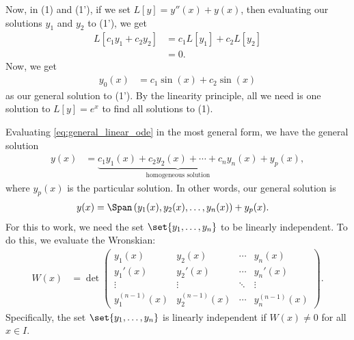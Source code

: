 \documentclass[10pt]{mypackage}
\begin{document}
Now, in (1) and (1'), if we set $L\left[y\right] = y''(x) + y(x)$, then evaluating our solutions $y_1$ and $y_2$ to (1'), we get
\begin{align*}
  L\left[c_1y_1 + c_2y_2\right] &= c_1L\left[y_1\right] + c_2L\left[y_2\right]\\
                                &= 0.
\end{align*}
Now, we get
\begin{align*}
  y_0(x) &= c_1\sin(x) + c_2\sin(x)
\end{align*}
as our general solution to (1'). By the linearity principle, all we need is one solution to $L\left[y\right] = e^x$ to find all solutions to (1).\newline

Evaluating \eqref{eq:general_linear_ode} in the most general form, we have the general solution
\begin{align*}
  y(x) &= \underbrace{c_1y_1(x) + c_2y_2(x) + \cdots + c_ny_n(x)}_{\text{homogeneous solution}} + y_p(x),
\end{align*}
where $y_p(x)$ is the particular solution. In other words, our general solution is
\begin{align*}
  y(x) &= \Span\left(y_1(x),y_2(x),\dots,y_n(x)\right) + y_p(x).
\end{align*}
For this to work, we need the set $\set{y_1,\dots,y_n}$ to be linearly independent. To do this, we evaluate the Wronskian:
{\renewcommand{\arraystretch}{1.5}
  \begin{align*}
  W(x) &= \det \begin{pmatrix}y_1(x) & y_2(x) & \cdots & y_n(x) \\ y_1'(x)& y_2'(x) & \cdots & y_n'(x) \\ \vdots & \vdots & \ddots & \vdots \\ y_{1}^{(n-1)}(x) & y_2^{(n-1)}(x) & \cdots & y_{n}^{(n-1)}(x)\end{pmatrix}.
\end{align*}
}
Specifically, the set $\set{y_1,\dots,y_n}$ is linearly independent if $W(x)\neq 0$ for all $x\in I$.
\end{document}
